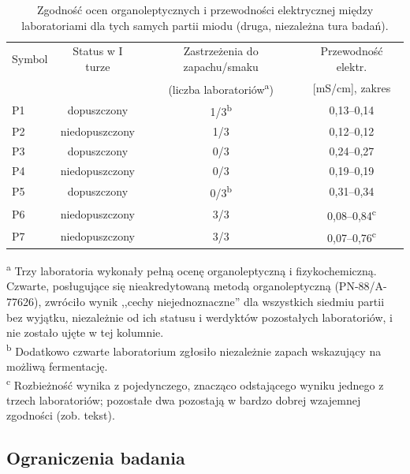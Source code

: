 \documentclass[12pt,a4paper]{article}
\begin{document}
\begin{table}[h!]
\centering
\caption{Zgodność ocen organoleptycznych i przewodności elektrycznej między
laboratoriami dla tych samych partii miodu (druga, niezależna tura badań).}
\label{tab:interlab}
\footnotesize
\begin{tabular}{@{}lccc@{}}
\toprule
Symbol & Status w I turze & Zastrzeżenia do zapachu/smaku & Przewodność elektr. \\
 &  & (liczba laboratoriów\textsuperscript{a}) & [mS/cm], zakres \\
\midrule
P1 & dopuszczony      & 1/3\textsuperscript{b} & 0,13--0,14 \\
P2 & niedopuszczony   & 1/3                     & 0,12--0,12 \\
P3 & dopuszczony      & 0/3                     & 0,24--0,27 \\
P4 & niedopuszczony   & 0/3                     & 0,19--0,19 \\
P5 & dopuszczony      & 0/3\textsuperscript{b}  & 0,31--0,34 \\
P6 & niedopuszczony   & 3/3                     & 0,08--0,84\textsuperscript{c} \\
P7 & niedopuszczony   & 3/3                     & 0,07--0,76\textsuperscript{c} \\
\bottomrule
\end{tabular}

\vspace{2pt}
{\footnotesize
\begin{flushleft}
\textsuperscript{a} Trzy laboratoria wykonały pełną ocenę organoleptyczną i
fizykochemiczną. Czwarte, posługujące się nieakredytowaną metodą organoleptyczną
(PN-88/A-77626), zwróciło wynik ,,cechy niejednoznaczne'' dla wszystkich siedmiu partii
bez wyjątku, niezależnie od ich statusu i werdyktów pozostałych laboratoriów, i nie
zostało ujęte w tej kolumnie.\\
\textsuperscript{b} Dodatkowo czwarte laboratorium zgłosiło niezależnie zapach
wskazujący na możliwą fermentację.\\
\textsuperscript{c} Rozbieżność wynika z pojedynczego, znacząco odstającego wyniku
jednego z trzech laboratoriów; pozostałe dwa pozostają w bardzo dobrej wzajemnej
zgodności (zob. tekst).
\end{flushleft}
}
\end{table}
\FloatBarrier

\subsection{Ograniczenia badania}
\label{sub:ograniczenia}
\end{document}
